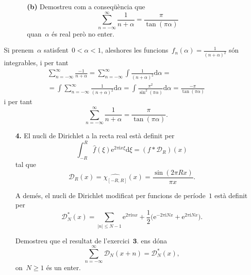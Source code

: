 \documentclass[a4paper]{article}
\theoremstyle{plain}
\newcommand{\iu}{\mathrm{i}}
\newcommand{\e}{\mathrm{e}}
\providecommand{\uppi}{\pi}
\newcommand{\diff}{\mathrm{d}}
\newcommand{\abs}[1]{\lvert{#1}\rvert}
\newcommand{\D}{\mathcal{D}}
\begin{document}
\begin{enumerate}
    \item[]\begin{enumerate}
        \item[\textbf{(b)}] Demostreu com a conseqüència que
            \[
                \sum_{n=-\infty}^{\infty} \frac{1}{n+\alpha}
                = \frac{\uppi}{\tan(\uppi\alpha)}
            \]
            quan~\(\alpha\) és real però no enter.
    \end{enumerate}
\end{enumerate}

Si prenem~\(\alpha\) satisfent~\(0<\alpha<1\), aleshores les
funcions~\(f_{n}(\alpha)=\frac{1}{(n+\alpha)^{2}}\) són integrables, i per tant
\begin{multline*}
    \sum_{n=-\infty}^{\infty}
    \frac{-1}{n+\alpha}
    =
    \sum_{n=-\infty}^{\infty}
    \int
    \frac{1}{(n+\alpha)^{2}}
    \diff\alpha
    = \\ =
    \int
    \sum_{n=-\infty}^{\infty}
    \frac{1}{(n+\alpha)^{2}}
    \diff\alpha
    =
    \int
    \frac{\uppi^{2}}{\sin^{2}(\uppi\alpha)}
    \diff\alpha
    =
    \frac{-\uppi}{\tan(\uppi\alpha)}
\end{multline*}
i per tant
\[
    \sum_{n=-\infty}^{\infty} \frac{1}{n+\alpha}
    = \frac{\uppi}{\tan(\uppi\alpha)}.
\]

\begin{enumerate}
    \item[\textbf{4.}] El nucli de Dirichlet a la recta real està definit per
        \[
            \int_{-R}^{R}\widehat{f}(\xi)\e^{2\uppi\iu x\xi}\diff\xi
            = (f\ast \D_{R})(x)
        \]
        tal que
        \[
            \D_{R}(x) = \widehat{\chi_{[-R,R]}}(x)
            = \frac{\sin(2\uppi Rx)}{\uppi x}.
        \]

        A demés, el nucli de Dirichlet modificat per funcions de període~\(1\)
        està definit per
        \[
            \D^{\ast}_{N}(x)
            = \sum_{\abs{n} \leq N-1} \e^{2\uppi\iu nx}
            + \frac{1}{2}\bigl(\e^{-2\uppi\iu Nx} + \e^{2\uppi\iu Nx}\bigr).
        \]

        Demostreu que el resultat de l'exercici~\(\textbf{3.}\) ens dóna
        \[
            \sum_{n=-\infty}^{\infty} \D_{N}(x+n) = \D^{\ast}_{N}(x),
        \]
        on~\(N\geq1\) és un enter.
\end{enumerate}
\end{document}
